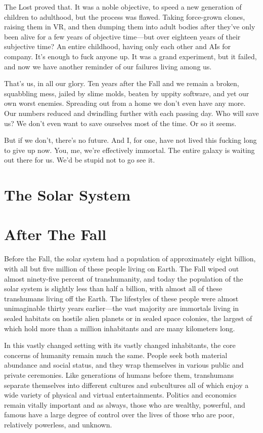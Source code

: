 The Lost proved that. It was a noble objective, to 
speed a new generation of children to adulthood, but 
the process was flawed. Taking force-grown clones, 
raising them in VR, and then dumping them into adult 
bodies after they've only been alive for a few years 
of objective time—but over eighteen years of their 
subjective time? An entire childhood, having only 
each other and AIs for company. It's enough to fuck 
anyone up. It was a grand experiment, but it failed, 
and now we have another reminder of our failures 
living among us.

That's us, in all our glory. Ten years after the Fall 
and we remain a broken, squabbling mess, jailed by 
slime molds, beaten by uppity software, and yet our 
own worst enemies. Spreading out from a home we 
don't even have any more. Our numbers reduced and 
dwindling further with each passing day. Who will 
save us? We don't even want to save ourselves most of 
the time. Or so it seems.

But if we don't, there's no future. And I, for one, 
have not lived this fucking long to give up now. You, 
me, we're effectively immortal. The entire galaxy is 
waiting out there for us. We'd be stupid not to go 
see it.

\section{The Solar System }


\section{After The Fall}

Before the Fall, the solar system had a population of 
approximately eight billion, with all but five million 
of these people living on Earth. The Fall wiped out 
almost ninety-five percent of transhumanity, and 
today the population of the solar system is slightly less 
than half a billion, with almost all of these transhumans
living off the Earth. The lifestyles of these people
were almost unimaginable thirty years earlier—the 
vast majority are immortals living in sealed habitats 
on hostile alien planets or in sealed space colonies, the 
largest of which hold more than a million inhabitants 
and are many kilometers long.

In this vastly changed setting with its vastly 
changed inhabitants, the core concerns of humanity 
remain much the same. People seek both material 
abundance and social status, and they wrap themselves
in various public and private ceremonies. Like
generations of humans before them, transhumans 
separate themselves into different cultures and subcultures
all of which enjoy a wide variety of physical
and virtual entertainments. Politics and economics 
remain vitally important and as always, those who are 
wealthy, powerful, and famous have a large degree of 
control over the lives of those who are poor, relatively 
powerless, and unknown.

